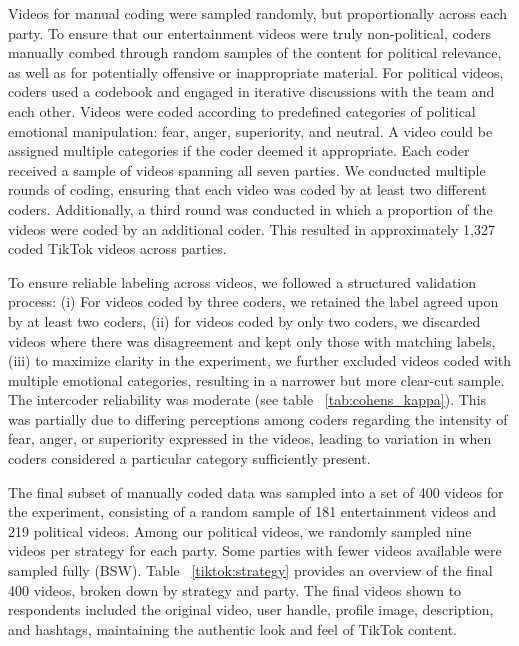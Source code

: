 \documentclass[12pt]{article}
\begin{document}
Videos for manual coding were sampled randomly, but proportionally across each party. To ensure that our entertainment videos were truly non-political, coders manually combed through random samples of the content for political relevance, as well as for potentially offensive or inappropriate material. For political videos, coders used a codebook and engaged in iterative discussions with the team and each other. Videos were coded according to predefined categories of political emotional manipulation: fear, anger, superiority, and neutral. A video could be assigned multiple categories if the coder deemed it appropriate. Each coder received a sample of videos spanning all seven parties. We conducted multiple rounds of coding, ensuring that each video was coded by at least two different coders. Additionally, a third round was conducted in which a proportion of the videos were coded by an additional coder. This resulted in approximately 1,327 coded TikTok videos across parties.  

To ensure reliable labeling across videos, we followed a structured validation process: (i) For videos coded by three coders, we retained the label agreed upon by at least two coders, (ii) for videos coded by only two coders, we discarded videos where there was disagreement and kept only those with matching labels, (iii) to maximize clarity in the experiment, we further excluded videos coded with multiple emotional categories, resulting in a narrower but more clear-cut sample. The intercoder reliability was moderate (see table ~\ref{tab:cohens_kappa}). This was partially due to differing perceptions among coders regarding the intensity of fear, anger, or superiority expressed in the videos, leading to variation in when coders considered a particular category sufficiently present.

The final subset of manually coded data was sampled into a set of 400 videos for the experiment, consisting of a random sample of 181 entertainment videos and 219 political videos. Among our political videos, we randomly sampled nine videos per strategy for each party. Some parties with fewer videos available were sampled fully (BSW). Table ~\ref{tiktok:strategy} provides an overview of the final 400 videos, broken down by strategy and party. 
The final videos shown to respondents included the original video, user handle, profile image, description, and hashtags, maintaining the authentic look and feel of TikTok content.
\end{document}
